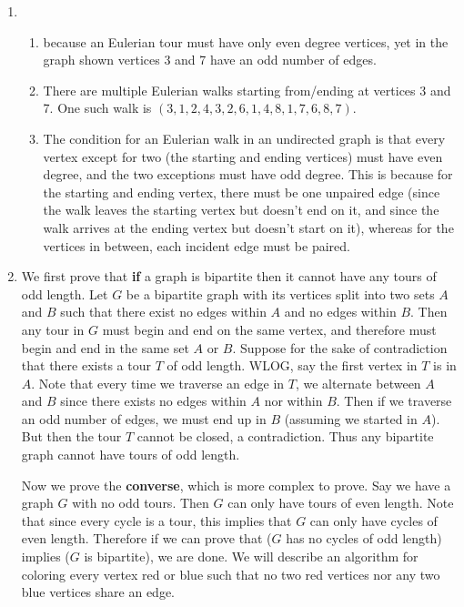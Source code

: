 \begin{enumerate}
    \item
    \begin{enumerate}
        \setlength{\parskip}{8pt}
        \item {} because an Eulerian tour must have only even degree vertices, yet in the graph shown vertices 3 and 7 have an odd number of edges.
        \item {} There are multiple Eulerian walks starting from/ending at vertices 3 and 7. One such walk is $(3,1,2,4,3,2,6,1,4,8,1,7,6,8,7)$.
        \item The condition for an Eulerian walk in an undirected graph is that every vertex except for two (the starting and ending vertices) must have even degree, and the two exceptions must have odd degree. This is because for the starting and ending vertex, there must be one unpaired edge (since the walk leaves the starting vertex but doesn't end on it, and since the walk arrives at the ending vertex but doesn't start on it), whereas for the vertices in between, each incident edge must be paired.
    \end{enumerate}
    \item We first prove that \textbf{if} a graph is bipartite then it cannot have any tours of odd length. Let $G$ be a bipartite graph with its vertices split into two sets $A$ and $B$ such that there exist no edges within $A$ and no edges within $B$. Then any tour in $G$ must begin and end on the same vertex, and therefore must begin and end in the same set $A$ or $B$. Suppose for the sake of contradiction that there exists a tour $T$ of odd length. WLOG, say the first vertex in $T$ is in $A$. Note that every time we traverse an edge in $T$, we alternate between $A$ and $B$ since there exists no edges within $A$ nor within $B$. Then if we traverse an odd number of edges, we must end up in $B$ (assuming we started in $A$). But then the tour $T$ cannot be closed, a contradiction. Thus any bipartite graph cannot have tours of odd length.
    
    Now we prove the \textbf{converse}, which is more complex to prove. Say we have a graph $G$ with no odd tours. Then $G$ can only have tours of even length. Note that since every cycle is a tour, this implies that $G$ can only have cycles of even length. Therefore if we can prove that ($G$ has no cycles of odd length) implies ($G$ is bipartite), we are done. We will describe an algorithm for coloring every vertex red or blue such that no two red vertices nor any two blue vertices share an edge. 
    

\end{enumerate}
